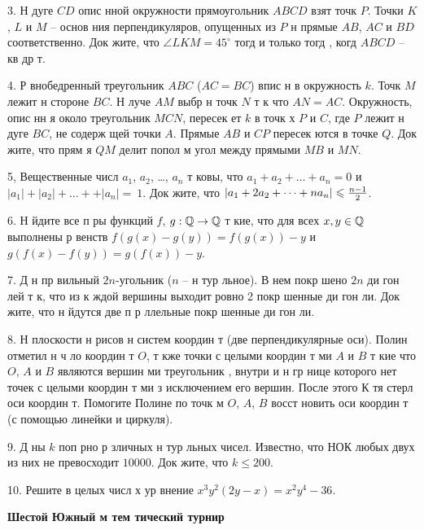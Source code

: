 3. Н  дуге $CD$ опис нной окружности прямоугольник  $ABCD$ взят  точк  $P$.
Точки $K$, $L$ и $M$ -- основ ния перпендикуляров, опущенных из $P$ н  прямые
$AB$, $AC$ и $BD$ соответственно. Док жите, что $\angle LKM=45^\circ$
тогд  и только тогд , когд  $ABCD$ -- кв др т.

4. Р внобедренный треугольник $ABC$ ($AC=BC$) впис н в окружность $k$.
Точк  $M$ лежит н  стороне $BC$. Н  луче $AM$ выбр н  точк  $N$ т к что $AN = AC$.
Окружность, опис нн я около треугольник  $MCN$, пересек ет $k$ в точк х $P$ и $C$, где
$P$ лежит н  дуге $BC$, не содерж щей точки $A$. Прямые $AB$ и $CP$ пересек ются в точке $Q$.
Док жите, что прям я $QM$ делит попол м угол между прямыми
$MB$ и $MN$. %

5, Вещественные числ  $a_1$, $a_2$, \dots, $a_n$ т ковы, что
$a_1+a_2+\dots+a_n=0$ и $|a_1|+|a_2|+\dots++|a_n|=~1$. Док жите, что
$|a_1+2a_2+\dots+na_n|\leq {n-1\over 2}$.

6. Н йдите все п ры функций $f$, $g: \Q\to \Q$ т кие, что для всех $x, y\in \Q$
выполнены р венств 
$f(g(x)-g(y))=f(g(x))-y$ и $g(f(x)-f(y))=g(f(x))-y$.

7. Д н пр вильный  $2n$-угольник ($n$ -- н тур льное).
В нем покр шено $2n$ ди гон лей т к, что из к ждой вершины выходит ровно
2 покр шенные ди гон ли.
Док жите, что н йдутся две п р ллельные покр шенные ди гон ли.

8. Н  плоскости н рисов н  систем  координ т (две перпендикулярные оси).
Полин  отметил  н ч ло координ т $O$,    т кже точки
с целыми координ т ми $A$ и $B$ т кие
что $O$, $A$ и $B$ являются вершин ми треугольник , внутри и н  гр нице которого
нет точек с целыми координ т ми з  исключением его вершин. После этого К тя стерл  оси координ т.
Помогите Полине по точк м $O$, $A$, $B$ восст новить оси координ т
(с помощью линейки и циркуля).

9. Д ны $k$ поп рно р зличных н тур льных чисел. Известно, что
НОК любых двух из них не превосходит
$10000$.
Док жите, что $k\leq 200$.

10. Решите в целых числ х ур внение $x^3y^2(2y-x)=x^2y^4-36$.

\vfill\eject

\centerline{\bf Шестой Южный м тем тический турнир}

\smallskip

